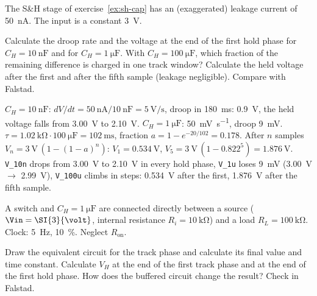 The S\&H stage of exercise~\ref{ex:sh-cap} has an (exaggerated) leakage current of
\SI{50}{\nano\ampere}. The input is a constant \SI{3}{\volt}.
\begin{talist}
\ta Calculate the droop rate and the voltage at the end of the first hold
	phase for $C_H = \SI{10}{\nano\farad}$ and for $C_H = \SI{1}{\micro\farad}$.
\ta With $C_H = \SI{100}{\micro\farad}$, which fraction of the remaining
	difference is charged in one track window? Calculate the held voltage after
	the first and after the fifth sample (leakage negligible).
\ta Compare with Falstad.
\end{talist}

\begin{solution}
\begin{talist}
\ta $C_H = \SI{10}{\nano\farad}$: $dV/dt = \SI{50}{\nano\ampere}/\SI{10}{\nano\farad} = \SI{5}{\volt\per\second}$,
	droop in \SI{180}{\milli\second}: \SI{0.9}{\volt}, the held voltage falls from \SI{3.00}{\volt} to \SI{2.10}{\volt}.
	$C_H = \SI{1}{\micro\farad}$: \SI{50}{\milli\volt\per\second}, droop \SI{9}{\milli\volt}.
\ta $\tau = \SI{1.02}{\kilo\ohm}\cdot\SI{100}{\micro\farad} = \SI{102}{\milli\second}$,
	fraction $a = 1-e^{-20/102} = 0.178$. After $n$ samples
	$V_n = \SI{3}{\volt}\,(1-(1-a)^n)$: $V_1 = \SI{0.534}{\volt}$,
	$V_5 = \SI{3}{\volt}\,(1-0.822^5) = \SI{1.876}{\volt}$.
\ta {}\newline \texttt{V\_10n} drops from \SI{3.00}{\volt} to \SI{2.10}{\volt} in every hold phase,
	\texttt{V\_1u} loses \SI{9}{\milli\volt} (\SI{3.00}{\volt} $\to$ \SI{2.99}{\volt}),
	\texttt{V\_100u} climbs in steps: \SI{0.534}{\volt} after the first, \SI{1.876}{\volt} after the fifth sample.
\end{talist}
\end{solution}

A switch and $C_H = \SI{1}{\micro\farad}$ are connected directly between a
source ($\Vin = \SI{3}{\volt}$, internal resistance $R_i = \SI{10}{\kilo\ohm}$)
and a load $R_L = \SI{100}{\kilo\ohm}$. Clock: \SI{5}{\hertz}, \SI{10}{\percent}.
Neglect $R_\mathrm{on}$.
\begin{talist}
\ta Draw the equivalent circuit for the track phase and calculate its final
	value and time constant.
\ta Calculate $V_H$ at the end of the first track phase and at the end of
	the first hold phase.
\ta How does the buffered circuit change the result? Check in Falstad.
\end{talist}

